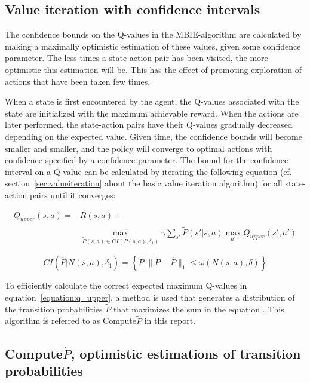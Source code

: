 \subsection{Value iteration with confidence intervals}
\label{sec:modification_conf_interval}

The confidence  bounds on the Q-values in the MBIE-algorithm are calculated by
making a maximally optimistic estimation of these values, given some confidence
parameter. The less times a state-action pair has been visited, the more
optimistic this estimation will be. This has the effect of promoting
exploration of actions that have been taken few times. 

When a state is first encountered by the agent, the Q-values associated with
the state are initialized with the maximum achievable reward. When the actions
are later performed, the state-action pairs have their Q-values gradually
decreased depending on the expected value. Given time, the confidence bounds will
become smaller and smaller, and the policy will converge to optimal actions
with confidence specified by a confidence parameter. The bound for the
confidence interval on a Q-value can be calculated by iterating the following
equation (cf. section~\ref{sec:valueiteration} about the basic value iteration
algorithm) for all state-action pairs until it converges:

\begin{align}
\label{equation:q_upper}
Q_{upper} (s, a) = & R(s, a) + \nonumber \\
& \operatorname*{max}_{\tilde{P}(s, a)\in CI(P(s, a), \delta_1)} \gamma \sum_{s'} \tilde{P}(s'|s, a)\operatorname*{max}_{a'} Q_{upper}(s', a')
\end{align}

\begin{equation}
\label{equation:balls_of_steels}
CI\left(\hat{P} \left| N(s, a), \delta_1\right.\right)  = \left\{\tilde{P} \left| \|\tilde{P} - \hat{P}\|_1 \le \omega(N(s,a), \delta)\right.\right\}
\end{equation}

To efficiently calculate the correct expected maximum Q-values in
equation~\eqref{equation:q_upper}, a method is used that generates a
distribution of the transition probabilities $\tilde{P}$ that maximizes the sum
in the equation \parencite{Strehl20081309}. This algorithm is referred to as
Compute$\tilde{P}$ in this report.

\subsection{Compute$\tilde{P}$, optimistic estimations of transition probabilities}

